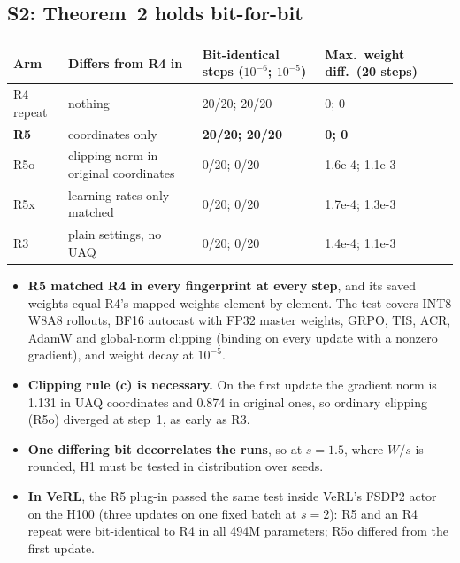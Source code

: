\documentclass[11pt]{article}
\begin{document}
\subsection{S2: Theorem~2 holds bit-for-bit}\label{sec:s2-results}
\begin{center}\small
\begin{tabularx}{\linewidth}{@{}l L l l@{}}
\toprule
Arm & Differs from R4 in & Bit-identical steps ($10^{-6}$; $10^{-5}$) & Max.\ weight diff.\ (20 steps)\\
\midrule
R4 repeat & nothing & 20/20; 20/20 & 0; 0\\
\textbf{R5} & coordinates only & \textbf{20/20; 20/20} & \textbf{0; 0}\\
R5o & clipping norm in original coordinates & 0/20; 0/20 & 1.6e-4; 1.1e-3\\
R5x & learning rates only matched & 0/20; 0/20 & 1.7e-4; 1.3e-3\\
R3 & plain settings, no UAQ & 0/20; 0/20 & 1.4e-4; 1.1e-3\\
\bottomrule
\end{tabularx}
\end{center}
\begin{itemize}
\item \textbf{R5 matched R4 in every fingerprint at every step}, and its saved weights equal R4's mapped weights element by element. The test covers INT8 W8A8 rollouts, BF16 autocast with FP32 master weights, GRPO, TIS, ACR, AdamW and global-norm clipping (binding on every update with a nonzero gradient), and weight decay at $10^{-5}$.
\item \textbf{Clipping rule (c) is necessary.} On the first update the gradient norm is 1.131 in UAQ coordinates and 0.874 in original ones, so ordinary clipping (R5o) diverged at step~1, as early as R3.
\item \textbf{One differing bit decorrelates the runs}, so at $s=1.5$, where $W/s$ is rounded, H1 must be tested in distribution over seeds.
\item \textbf{In VeRL}, the R5 plug-in passed the same test inside VeRL's FSDP2 actor on the H100 (three updates on one fixed batch at $s=2$): R5 and an R4 repeat were bit-identical to R4 in all 494M parameters; R5o differed from the first update.
\end{itemize}
\end{document}
